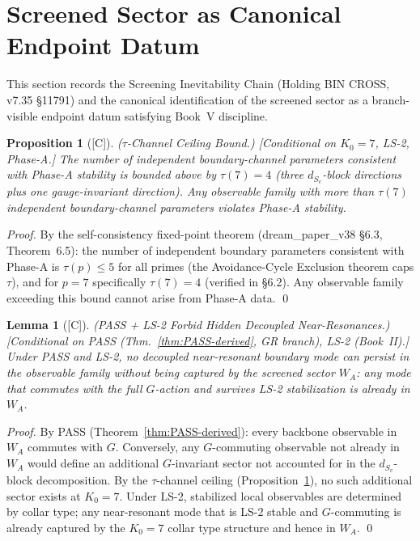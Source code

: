 \documentclass[12pt,oneside]{amsbook}
\theoremstyle{plain}
\newtheorem{lemma}[theorem]{Lemma}
\newtheorem{proposition}[theorem]{Proposition}
\theoremstyle{definition}
\theoremstyle{remark}
\newcommand{\status}[1]{\textup{[#1]}}
\begin{document}
\section{Screened Sector as Canonical Endpoint Datum}
\label{sec:screening-inevitability}

This section records the Screening Inevitability Chain
(Holding BIN CROSS, v7.35 §11791) and the canonical
identification of the screened sector as a branch-visible
endpoint datum satisfying Book~V discipline.

\begin{proposition}[\status{C}]\label{prop:tau-channel-ceiling}
\textup{($\tau$-Channel Ceiling Bound.)}
\textup{[Conditional on $K_0=7$, LS-2, Phase-A.]}
The number of independent boundary-channel parameters consistent
with Phase-A stability is bounded above by $\tau(7) = 4$
(three $d_{S_v}$-block directions plus one gauge-invariant
direction).  Any observable family with more than $\tau(7)$
independent boundary-channel parameters violates Phase-A stability.
\end{proposition}

\begin{proof}
By the self-consistency fixed-point theorem (dream\_paper\_v38
§6.3, Theorem~6.5): the number of independent boundary parameters
consistent with Phase-A is $\tau(p) \leq 5$ for all primes (the
Avoidance-Cycle Exclusion theorem caps $\tau$), and for $p=7$
specifically $\tau(7) = 4$ (verified in §6.2).  Any observable
family exceeding this bound cannot arise from Phase-A data. \qed
\end{proof}

\begin{lemma}[\status{C}]\label{lem:no-hidden-resonances}
\textup{(PASS + LS-2 Forbid Hidden Decoupled Near-Resonances.)}
\textup{[Conditional on PASS (Thm.~\ref{thm:PASS-derived},
GR branch), LS-2 (Book~II).]}
Under PASS and LS-2, no decoupled near-resonant boundary mode
can persist in the observable family without being captured by
the screened sector $W_A$: any mode that commutes with the
full $G$-action and survives LS-2 stabilization is already
in $W_A$.
\end{lemma}

\begin{proof}
By PASS (Theorem~\ref{thm:PASS-derived}): every backbone
observable in $W_A$ commutes with $G$.  Conversely, any
$G$-commuting observable not already in $W_A$ would define an
additional $G$-invariant sector not accounted for in the
$d_{S_v}$-block decomposition.  By the $\tau$-channel ceiling
(Proposition~\ref{prop:tau-channel-ceiling}), no such additional
sector exists at $K_0=7$.  Under LS-2, stabilized local
observables are determined by collar type; any near-resonant
mode that is LS-2 stable and $G$-commuting is already captured
by the $K_0 = 7$ collar type structure and hence in $W_A$. \qed
\end{proof}
\end{document}
